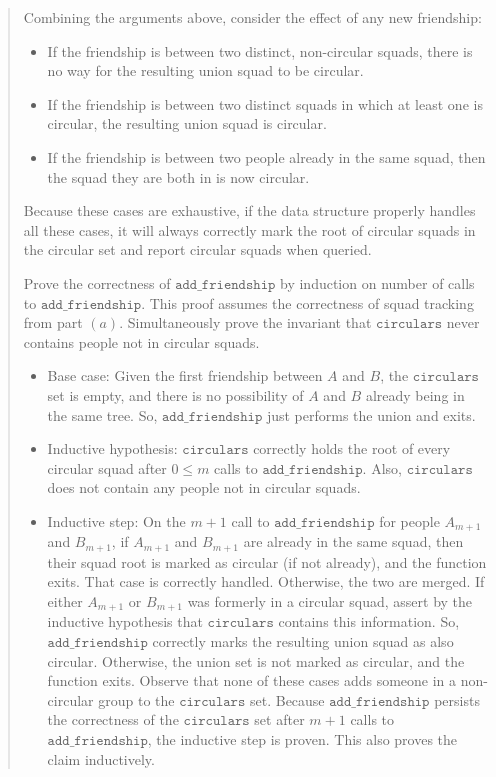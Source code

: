 \documentclass[11pt]{article}
\newcommand{\code}[1]{$\texttt{#1}$}
\begin{document}
\begin{enumerate}
\begin{quote}
\medskip
Combining the arguments above, consider the effect of any new friendship:
\begin{itemize}
  \item If the friendship is between two distinct, non-circular squads, there is no way for the resulting union squad to be circular. 
  \item If the friendship is between two distinct squads in which at least one is circular, the resulting union squad is circular. 
  \item If the friendship is between two people already in the same squad, then the squad they are both in is now circular. 
\end{itemize}
Because these cases are exhaustive, if the data structure properly handles all these cases, it will always correctly mark the root of circular squads in the circular set and report circular squads when queried.

\medskip
Prove the correctness of \code{add\_friendship} by induction on number of calls to \code{add\_friendship}. This proof assumes the correctness of squad tracking from part $(a)$. Simultaneously prove the invariant that \code{circulars} never contains people not in circular squads.
\begin{itemize}
  \item Base case: Given the first friendship between $A$ and $B$, the \code{circulars} set is empty, and there is no possibility of $A$ and $B$ already being in the same tree.  So, \code{add\_friendship} just performs the union and exits.
  \item Inductive hypothesis: \code{circulars} correctly holds the root of every circular squad after $0 \leq m$ calls to \code{add\_friendship}. Also, \code{circulars} does not contain any people not in circular squads. 
  \item Inductive step: On the $m + 1$ call to \code{add\_friendship} for people $A_{m + 1}$ and $B_{m + 1}$, if $A_{m + 1}$ and $B_{m + 1}$ are already in the same squad, then their squad root is marked as circular (if not already), and the function exits. That case is correctly handled. Otherwise, the two are merged. If either $A_{m + 1}$ or $B_{m + 1}$ was formerly in a circular squad, assert by the inductive hypothesis that \code{circulars} contains this information. So, \code{add\_friendship} correctly marks the resulting union squad as also circular. Otherwise, the union set is not marked as circular, and the function exits. Observe that none of these cases adds someone in a non-circular group to the \code{circulars} set. Because \code{add\_friendship} persists the correctness of the \code{circulars} set after $m + 1$ calls to \code{add\_friendship}, the inductive step is proven. This also proves the claim inductively.
\end{itemize}


\end{quote}
\end{enumerate}
\end{document}
